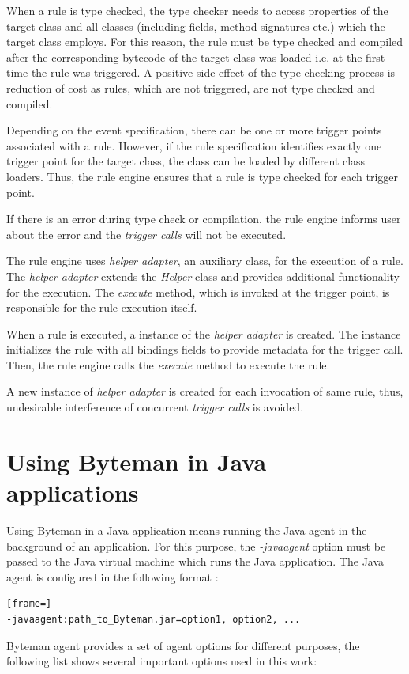 \documentclass[12pt,oneside]{fithesis2}
\begin{document}
When a rule is type checked, the type checker needs to access properties of the target class and all classes (including fields, method signatures etc.) which the target class employs. For this reason, the rule must be type checked and compiled after the corresponding bytecode of the target class was loaded i.e. at the first time the rule was triggered. A positive side effect of the type checking process is reduction of cost as rules, which are not triggered, are not type checked and compiled.

Depending on the event specification, there can be one or more trigger points associated with a rule. However, if the rule specification identifies exactly one trigger point for the target class, the class can be loaded by different class loaders. Thus, the rule engine ensures that a rule is type checked for each trigger point.

If there is an error during type check or compilation, the rule engine informs user about the error and the \textit{trigger calls} will not be executed.

The rule engine uses \textit{helper adapter}, an auxiliary class, for the execution of a rule. The \textit{helper adapter} extends the \textit{Helper} class and provides additional functionality for the execution. The \textit{execute} method, which is invoked at the trigger point, is responsible for the rule execution itself.

When a rule is executed, a instance of the \textit{helper adapter} is created. The instance initializes the rule with all bindings fields to provide metadata for the trigger call. Then, the rule engine calls the \textit{execute} method to execute the rule.

A new instance of \textit{helper adapter} is created for each invocation of same rule, thus, undesirable interference of concurrent \textit{trigger calls} is avoided.

\section{Using Byteman in Java applications}
Using Byteman in a Java application means running the Java agent in the background of an application. For this purpose, the \textit{-javaagent} option must be passed to the Java virtual machine which runs the Java application. The Java agent is configured in the following format \cite[Running Applications with Byteman]{byteman_doc}:
\begin{lstlisting}[frame=]
-javaagent:path_to_Byteman.jar=option1, option2, ...
\end{lstlisting}
Byteman agent provides a set of agent options for different purposes, the following list shows several important options used in this work:
\end{document}
